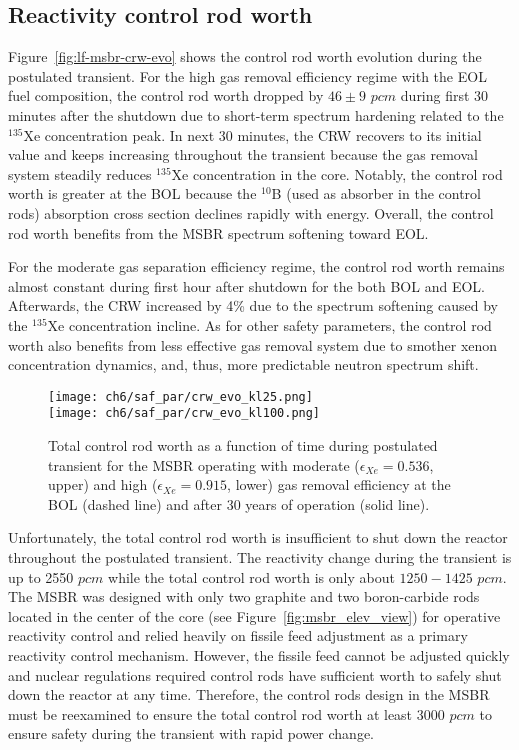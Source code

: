\subsection{Reactivity control rod worth}
Figure~\ref{fig:lf-msbr-crw-evo} shows the control rod worth evolution 
during the postulated transient. For the high gas removal efficiency regime 
with the \gls{EOL} fuel composition, the control rod worth dropped by $46\pm9$ 
$pcm$ during first 30 minutes after the shutdown due to short-term spectrum 
hardening related to the $^{135}$Xe concentration peak. In next 30 minutes, 
the CRW recovers to its initial value and keeps increasing throughout the 
transient because the gas removal system steadily reduces $^{135}$Xe 
concentration in the core. Notably, the control rod worth is greater at the 
\gls{BOL} because the $^{10}$B (used as absorber in the control rods) 
absorption cross section declines rapidly with energy. Overall, the control 
rod worth benefits from the \gls{MSBR} spectrum softening toward \gls{EOL}.

For the moderate gas separation efficiency regime, the control rod worth 
remains almost constant during first hour after shutdown for the both 
\gls{BOL} and \gls{EOL}. Afterwards, the CRW increased by 4\% due to the 
spectrum softening caused by the $^{135}$Xe concentration incline. As for 
other safety parameters, the control rod worth also benefits 
from less effective gas removal system due to smother xenon concentration 
dynamics, and, thus, more predictable neutron spectrum shift. 
\begin{figure}[htbp!] %
	\centering
	\texttt{[image: ch6/saf\_par/crw\_evo\_kl25.png]}\\
	\vspace{-10mm}
	\hspace{+0.05mm}
	\texttt{[image: ch6/saf\_par/crw\_evo\_kl100.png]}
	\vspace{-3mm}
	\caption{Total control rod worth as a function of time during 
		postulated transient
for the \gls{MSBR} operating with moderate 
		($\epsilon_{Xe}=0.536$, upper) and high ($\epsilon_{Xe}=0.915$, lower) 
		gas removal efficiency at the \gls{BOL} (dashed line) and after 30 
		years of operation (solid line).}
	\label{fig:msbr-lf-crw-evo}
\end{figure}

Unfortunately, the total control rod worth is insufficient to shut down the 
reactor throughout the postulated transient. The reactivity change during the 
transient is up to 2550 $pcm$ while the total control rod worth is only about 
$1250-1425$ $pcm$. The \gls{MSBR} was designed with only two graphite and two 
boron-carbide rods located in the center of the core (see 
Figure~\ref{fig:msbr_elev_view}) for operative reactivity control and relied 
heavily on fissile feed adjustment as a primary reactivity control 
mechanism. However, the fissile feed cannot be adjusted quickly and nuclear  
regulations required control rods have sufficient worth to safely shut down 
the reactor at any time. Therefore, the control rods design in the \gls{MSBR} 
must be reexamined to ensure the total control rod worth at least 3000 $pcm$ 
to ensure safety during the transient with rapid power change.


